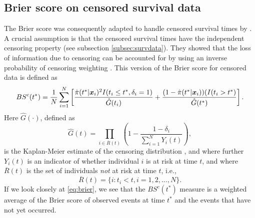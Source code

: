 \subsection{Brier score on censored survival data}
The Brier score was consequently adapted to handle censored survival times by \citet{graf}.
A crucial assumption is that the censored survival times have the independent censoring property (see subsection \ref{subsec:survdata}).
They showed that the loss of information due to censoring can be accounted for by using an inverse probability of censoring weighting \citep{bovelstadborgan}.
This version of the Brier score for censored data is defined as
\begin{equation}\label{eq:brier}
    BS^c(t^*)=\frac{1}{N}\sum_{i=1}^N\left[\frac{\hat{\pi}(t^*|\bm{x}_i)^2I(t_i\leq t^*,\delta_i=1)}{\hat{G}(t_i)}+\frac{(1-\hat{\pi}(t^*|\bm{x}_i))(I(t_i>t^*)}{\hat{G}(t^*)}\right].
\end{equation}
Here $\hat{G}(\cdot)$, defined as
\begin{equation*}
    \hat{G}(t)=\prod_{i\in \overline{R}(t)}\left(1-\frac{1-\delta_i}{\sum_{i=1}^NY_i(t)}\right),
\end{equation*}
is the Kaplan-Meier estimate of the censoring distribution \citep{bovelstadborgan}, and where further $Y_i(t)$ is an indicator of whether individual $i$ is at risk at time $t$, and where $\overline{R}(t)$ is the set of individuals \textit{not} at risk at time $t$, i.e.,
\begin{equation*}
    \overline{R}(t)=\{i\colon t_i<t,i=1,2,\ldots,N\}.
\end{equation*}
If we look closely at \eqref{eq:brier}, we see that the $BS^c(t^*)$ measure is a weighted average of the Brier score of observed events at time $t^*$ and the events that have not yet occurred.


